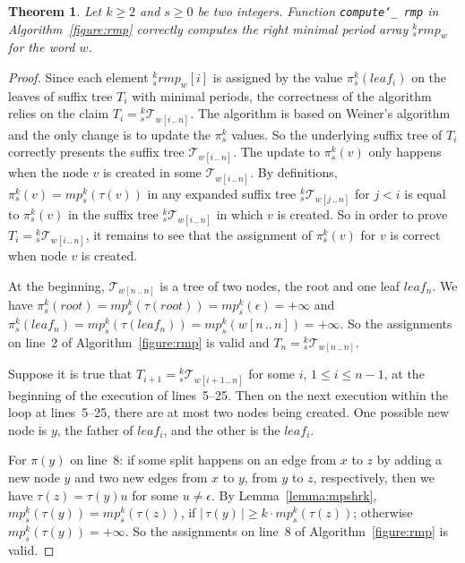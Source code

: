 \documentclass{article}
\def\us{\char`\_}
\def\subw#1#2#3{{#1[#2\,..\,#3]}}
\def\abs#1{{|\,#1\,|}}
\def\tree{\mathcal{T}}
\newtheorem{theorem}{Theorem}
\begin{document}
\begin{theorem}\label{theorem:correctness}
Let $k\geq2$ and $s\geq0$ be two integers. Function {\tt compute\us
rmp} in Algorithm~\ref{figure:rmp} correctly computes the right
minimal period array ${}_s^krmp_w$ for the word $w$.
\end{theorem}
\begin{proof}
Since each element ${}_s^krmp_w[i]$ is assigned by the value
$\pi_s^k(leaf_i)$ on the leaves of suffix tree $T_i$ with minimal
periods, the correctness of the algorithm relies on the claim
$T_i={}_s^k\tree_\subw{w}{i}{n}$. The algorithm is based on Weiner's
algorithm and the only change is to update the $\pi_s^k$ values. So
the underlying suffix tree of $T_i$ correctly presents the suffix
tree $\tree_\subw{w}{i}{n}$. The update to $\pi_s^k(v)$ only happens
when the node $v$ is created in some $\tree_\subw{w}{i}{n}$. By
definitions, $\pi_s^k(v)=mp_s^k(\tau(v))$ in any expanded suffix
tree ${}_s^k\tree_\subw{w}{j}{n}$ for $j<i$ is equal to $\pi_s^k(v)$
in the suffix tree ${}_s^k\tree_\subw{w}{i}{n}$ in which $v$ is
created. So in order to prove $T_i={}_s^k\tree_\subw{w}{i}{n}$, it
remains to see that the assignment of $\pi_s^k(v)$ for $v$ is
correct when node $v$ is created.

At the beginning, $\tree_\subw{w}{n}{n}$ is a tree of two nodes, the
root and one leaf $leaf_n$. We have
$\pi_s^k(root)=mp_s^k(\tau(root))=mp_s^k(\epsilon)=+\infty$ and
$\pi_s^k(leaf_n)=mp_s^k(\tau(leaf_n))=mp_s^k(\subw{w}{n}{n})=+\infty$.
So the assignments on line~2 of Algorithm~\ref{figure:rmp} is valid
and $T_n={}_s^k\tree_\subw{w}{n}{n}$.

Suppose it is true that $T_{i+1}={}_s^k\tree_\subw{w}{i+1}{n}$ for
some $i$, $1\leq i\leq n-1$, at the beginning of the execution of
lines~5--25. Then on the next execution within the loop at
lines~5--25, there are at most two nodes being created. One possible
new node is $y$, the father of $leaf_i$, and the other is the
$leaf_i$.

For $\pi(y)$ on line~8: if some split happens on an edge from $x$ to
$z$ by adding a new node $y$ and two new edges from $x$ to $y$, from
$y$ to $z$, respectively, then we have $\tau(z)=\tau(y)u$ for some
$u\neq\epsilon$. By Lemma~\ref{lemma:mpshrk},
$mp_s^k(\tau(y))=mp_s^k(\tau(z))$, if $\abs{\tau(y)}\geq k\cdot
mp_s^k(\tau(z))$; otherwise $mp_s^k(\tau(y))=+\infty$. So the
assignments on line~8 of Algorithm~\ref{figure:rmp} is valid.


\end{proof}
\end{document}
